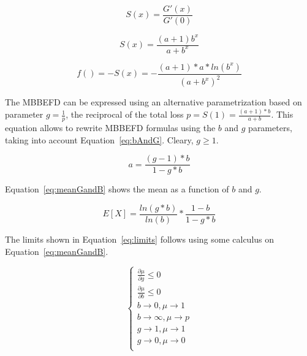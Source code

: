 \documentclass[nojss]{jss}
\begin{document}
\begin{equation}
S\left( x \right) = \frac{{G'\left( x \right)}}{{G'\left( 0 \right)}}
\label{eq:survival}
\end{equation}

\begin{equation}
S\left( x \right) =  \frac{{\left( {a + 1} \right){b^x}}}{{a + {b^x}}}
\label{eq:survival2}
\end{equation}

\begin{equation}
f\left (  \right )=-S\left ( x \right )=-\frac{\left ( a+1 \right )*a*ln\left ( b^x \right )}{\left ( a+b^x \right )^2}
\label{eq:density}
\end{equation}

The MBBEFD can be expressed using an alternative parametrization based on parameter $g=\frac{1}{p}$, the reciprocal of the total loss $p = S( 1 ) = \frac{ ( a+1 ) * b}{a + b}$. This equation allows to rewrite MBBEFD formulas using the $b$ and $g$ parameters, taking into account Equation~\ref{eq:bAndG}. Cleary, $g \ge 1$.

\begin{equation}
a=\frac{\left(g-1 \right )*b}{1-g*b}
\label{eq:bAndG}
\end{equation}

Equation~\ref{eq:meanGandB} shows the mean as a function of $b$ and $g$.

\begin{equation}
E\left [ X \right ]=\frac{ln\left(g*b \right )}{ln\left(b \right )}*\frac{1-b}{1-g*b}
\label{eq:meanGandB}
\end{equation}

The limits shown in Equation~\ref{eq:limits} follows using some calculus on Equation~\ref{eq:meanGandB}.

\begin{equation}
\left\{\begin{matrix}
\frac{\partial \mu}{\partial g} \le 0\\
\frac{\partial \mu}{\partial b} \le 0\\
b\rightarrow 0, \mu \rightarrow 1\\ 
b\rightarrow \infty, \mu \rightarrow p\\ 
g\rightarrow 1, \mu \rightarrow 1\\ 
g\rightarrow 0, \mu \rightarrow 0\\ 
\end{matrix}\right.
\label{eq:limits}
\end{equation}
\end{document}
